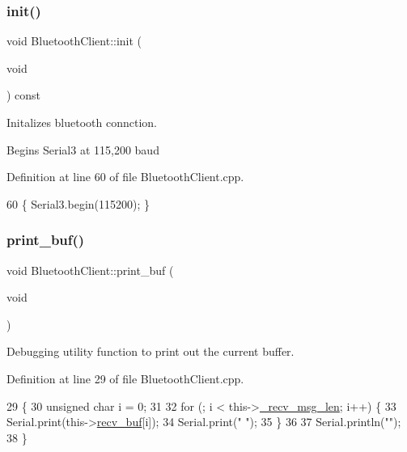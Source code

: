 \subsubsection{\texorpdfstring{init()}{init()}}
{\footnotesize\ttfamily void Bluetooth\+Client\+::init (\begin{DoxyParamCaption}\item[{void}]{ }\end{DoxyParamCaption}) const}



Initalizes bluetooth connction. 

Begins Serial3 at 115,200 baud 

Definition at line 60 of file Bluetooth\+Client.\+cpp.


\begin{DoxyCode}
60 \{ Serial3.begin(115200); \}
\end{DoxyCode}
\mbox{\label{class_bluetooth_client_ab43fcdea20009df8150e096e82a52ae6}} 
\subsubsection{\texorpdfstring{print\+\_\+buf()}{print\_buf()}}
{\footnotesize\ttfamily void Bluetooth\+Client\+::print\+\_\+buf (\begin{DoxyParamCaption}\item[{void}]{ }\end{DoxyParamCaption})\hspace{0.3cm}{\ttfamily [private]}}



Debugging utility function to print out the current buffer. 



Definition at line 29 of file Bluetooth\+Client.\+cpp.


\begin{DoxyCode}
29                                     \{
30     \textcolor{keywordtype}{unsigned} \textcolor{keywordtype}{char} i = 0;
31 
32     \textcolor{keywordflow}{for} (; i < this->\hyperlink{class_bluetooth_client_a30e47aa21808bd60b99cf5778e67c059}{\_recv\_msg\_len}; i++) \{
33         Serial.print(this->\hyperlink{class_bluetooth_client_a83675b45ddf8021663ecd6200a22b1cb}{recv\_buf}[i]);
34         Serial.print(\textcolor{stringliteral}{" "});
35     \}
36 
37     Serial.println(\textcolor{stringliteral}{""});
38 \}
\end{DoxyCode}
\mbox{\label{class_bluetooth_client_a938b0f547b483ff7d0ac5e64260a9c37}} 
